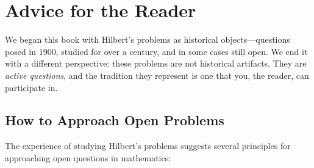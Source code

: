 \section{Advice for the Reader}

We began this book with Hilbert's problems as historical objects---questions posed in 1900, studied for over a century, and in some cases still open. We end it with a different perspective: these problems are not historical artifacts. They are \emph{active questions}, and the tradition they represent is one that you, the reader, can participate in.

\subsection{How to Approach Open Problems}

The experience of studying Hilbert's problems suggests several principles for approaching open questions in mathematics:

